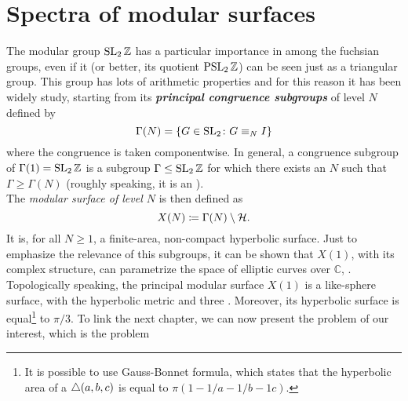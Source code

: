 



\section{Spectra of modular surfaces}

The modular group $\operatorname{SL}_{2}\mathbb{Z}$ has a particular importance in among the fuchsian groups, even if it (or better, its quotient $\operatorname{PSL}_{2}\mathbb{Z}$) can be seen just as a triangular group. This group has lots of arithmetic properties and for this reason it has been widely study, starting from its \emph{\textbf{principal congruence subgroups}} of level $N$ defined by
\begin{equation}
\label{eq:subgroups_congruence}
\Gamma(N)=\left\{
G\in\operatorname{SL}_{2}\colon G\equiv_{N}I
\right\}
\end{equation}
where the congruence \virg{$\equiv$} is taken componentwise. In general, a congruence subgroup of $\Gamma(1)=\operatorname{SL}_{2}\mathbb{Z}$ is a subgroup $\Gamma\leq\operatorname{SL}_{2}\mathbb{Z}$ for which there exists an $N$ such that $\Gamma\geq\Gamma(N)$ (roughly speaking, it is an ).\\
The \emph{modular surface of level $N$} is then defined as
\begin{equation}
X(N)\coloneqq \Gamma(N)\setminus\mathcal{H}.
\end{equation}
It is, for all $N\geq1$, a finite-area, non-compact hyperbolic surface. Just to emphasize the relevance of this subgroups, it can be shown that $X(1)$, with its complex structure, can parametrize the space of elliptic curves over $\mathbb{C}$, \cite{Shimura:book}.\\ %

Topologically speaking, the principal modular surface $X(1)$ is a like-sphere surface, with the hyperbolic metric and three . Moreover, its hyperbolic surface is equal\footnote{It is possible to use Gauss-Bonnet formula, which states that the hyperbolic area of a $\bigtriangleup(a,b,c)$ is equal to $\pi(1-1/a-1/b-1c)$.} to $\pi/3$. To link the next chapter, we can now present the problem of our interest, which is the  problem

